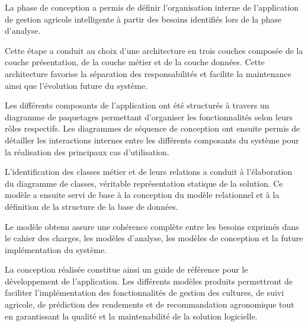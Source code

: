 \documentclass[
]{article}
\begin{document}
La phase de conception a permis de définir l'organisation interne de
l'application de gestion agricole intelligente à partir des besoins
identifiés lors de la phase d'analyse.

Cette étape a conduit au choix d'une architecture en trois couches
composée de la couche présentation, de la couche métier et de la couche
données. Cette architecture favorise la séparation des responsabilités
et facilite la maintenance ainsi que l'évolution future du système.

Les différents composants de l'application ont été structurés à travers
un diagramme de paquetages permettant d'organiser les fonctionnalités
selon leurs rôles respectifs. Les diagrammes de séquence de conception
ont ensuite permis de détailler les interactions internes entre les
différents composants du système pour la réalisation des principaux cas
d'utilisation.

L'identification des classes métier et de leurs relations a conduit à
l'élaboration du diagramme de classes, véritable représentation statique
de la solution. Ce modèle a ensuite servi de base à la conception du
modèle relationnel et à la définition de la structure de la base de
données.

Le modèle obtenu assure une cohérence complète entre les besoins
exprimés dans le cahier des charges, les modèles d'analyse, les modèles
de conception et la future implémentation du système.

La conception réalisée constitue ainsi un guide de référence pour le
développement de l'application. Les différents modèles produits
permettront de faciliter l'implémentation des fonctionnalités de gestion
des cultures, de suivi agricole, de prédiction des rendements et de
recommandation agronomique tout en garantissant la qualité et la
maintenabilité de la solution logicielle.
\end{document}
